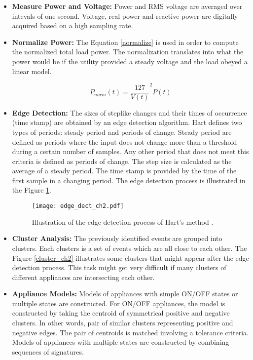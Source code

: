 \begin{itemize} 
    \item \textbf{Measure Power and Voltage:} Power and RMS voltage are averaged over intevals of one second. Voltage, real power and reactive power are digitally acquired based on a high sampling rate. 
    
    \item \textbf{Normalize Power:} The Equation \eqref{normalize} is used in order to compute the normalized total load power. The normalization translates into what the power would be if the utility provided a steady voltage and the load obeyed a linear model. 
    
    \begin{equation} \label{normalize}
         P_{norm}(t) = \frac{127}{V(t)}^2 P(t) 
    \end{equation}
    
    
    \item \textbf{Edge Detection:} The sizes of steplike changes and their times of occurrence (time stamp) are obtained by an edge detection algorithm. Hart defines two types of periods: steady period and periods of change. Steady period are defined as periods where the input does not change more than a threshold during a certain number of samples. Any other period that does not meet this criteria is defined as periods of change. The step size is calculated as the average of a steady period. The time stamp is provided by the time of the first sample in a changing period. The edge detection process is illustrated in the Figure \ref{edge_dect_ch2}.
    
        
\begin{figure}[htb]
    \centering
    \texttt{[image: edge\_dect\_ch2.pdf]}
    \caption{Illustration of the edge detection process of Hart's method \cite{hart}.}
    \label{edge_dect_ch2}
\end{figure}
    
    
    
    \item \textbf{Cluster Analysis:} The previously identified events are grouped into clusters. Each clusters is a set of events which are all close to each other. The Figure \ref{cluster_ch2} illustrates some clusters that might appear after the edge detection process. This task might get very difficult if many clusters of different appliances are intersecting each other. 
    
    \item \textbf{Appliance Models:} Models of appliances with simple ON/OFF states or multiple states are constructed. For ON/OFF appliances, the model is constructed by taking the centroid of symmetrical positive and negative clusters. In other words, pair of similar clusters representing positive and negative edges. The pair of centroids is matched involving a tolerance criteria. Models of appliances with multiple states are constructed by combining sequences of signatures. 


\end{itemize}
